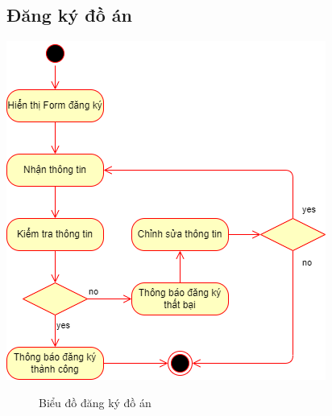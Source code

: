 \subsection{Đăng ký đồ án}
\begin{center}
	\includegraphics[width=.9\textwidth]{../drawio/activity/register_doan.png}
	\begin{figure}[h]
		\centering
		\caption{Biểu đồ đăng ký đồ án}
	\end{figure}
\end{center}

